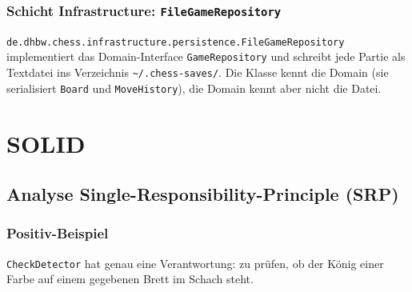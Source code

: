 \documentclass[a4paper,12pt]{article}
\let\oldsection\section
\renewcommand{\section}{\clearpage\oldsection}
\begin{document}
\subsubsection*{Schicht Infrastructure: \texttt{FileGameRepository}}

\texttt{de.dhbw.chess.infrastructure.persistence.FileGameRepository} implementiert das
Domain-Interface \texttt{GameRepository} und schreibt jede Partie als Textdatei ins
Verzeichnis \texttt{\textasciitilde/.chess-saves/}. Die Klasse kennt die Domain (sie serialisiert
\texttt{Board} und \texttt{MoveHistory}), die Domain kennt aber nicht die Datei.


\section{SOLID}

\subsection*{Analyse Single-Responsibility-Principle (SRP)}

\subsubsection*{Positiv-Beispiel}

\texttt{CheckDetector} hat genau eine Verantwortung: zu prüfen, ob der König einer Farbe auf
einem gegebenen Brett im Schach steht.

\end{document}
